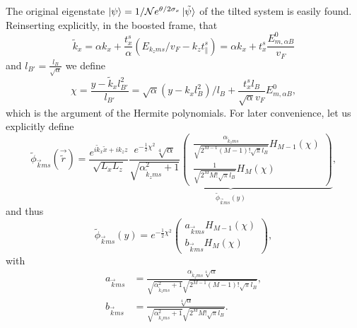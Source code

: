 The original eigenstate \(\ket{\psi } = 1 /\mathcal{N} e^{\theta /2 \sigma _{x}} \ket{\tilde{\psi} }\) of the tilted system is easily found.
Reinserting explicitly, in the boosted frame, that
\[
  \tilde{k}_{x} = \alpha k_{x} + \frac{t^s_x}{\alpha} (E_{k_z m s} /v_F- k_{z} t^s_{\parallel})
  = \alpha k_x + t^s_x \frac{E^0_{m, \alpha B} }{v_{F}}
\]
and \(l_{B'}=\frac{l_{B}}{\sqrt{\alpha} }\)
we define
\begin{equation}
  \label{eq:49}
  \chi =
  \frac{y-\tilde{k}_{x} l_{B'}^2}{l_{B'}}
  =
  \sqrt{\alpha } (y-k_{x} l_{B}^2) /l_{B}
  + \frac{ t^s_x l_B }{ \sqrt{\alpha} v_F} E^{0}_{m, \alpha B},
\end{equation}
which is the argument of the Hermite polynomials.
For later convenience, let us explicitly define
\begin{equation}
  \label{eq:50}
  \tilde{\phi} _{\vec{k} m s} (\vec{\tilde{r}}) =
  \frac{e^{i \tilde{k}_{x} \tilde{x} + i k_{z} z}}{\sqrt{L_{x} L_{z}} }
  \underbrace{
  \frac{
    e^{-\frac{1}{2} \chi ^2}
    \sqrt[4]{\alpha }
  }
  {\sqrt{\alpha^2_{\tilde{k}_{z} m s} + 1} }
  \begin{pmatrix}
    \frac{\alpha_{\tilde{k}_z m s}}{\sqrt{2^{M-1} (M-1)! \sqrt{\pi } l_{B}}} H_{M-1}\left( \chi  \right)\\
    \frac{1}{\sqrt{2^M M! \sqrt{\pi } l_{B}}} H_M \left( \chi \right)
  \end{pmatrix}}_{\tilde{\phi}_{\vec{k} m s} (y)},
\end{equation}
and thus
\begin{equation}
  \label{eq:51}
  \tilde{\phi}_{\vec{k} m s} (y) =
  e^{-\frac{1}{2} \chi ^2}
  \begin{pmatrix}
    a_{\vec{k} m s} H_{M-1} (\chi)\\
    b_{\vec{k} m s} H_{M} (\chi)
  \end{pmatrix},
\end{equation}
with
\begin{align}
 \label{eq:52}
  a_{\vec{k} m s} &=
                    \frac{
                    \alpha_{\tilde{k}_z m s} \sqrt[4]{\alpha }
                    }{
                    \sqrt{\alpha^2 _{\tilde{k}_z m s} + 1}
                    \sqrt{2^{M-1} (M-1)! \sqrt{\pi} l_B}
                    },\\
  \label{eq:53}
  b_{\vec{k} m s} &=
                    \frac{
                     \sqrt[4]{\alpha }
                    }{
                    \sqrt{\alpha^2 _{\tilde{k}_z m s} + 1}
                    \sqrt{2^{M} M! \sqrt{\pi} l_B}
                    }.
\end{align}

